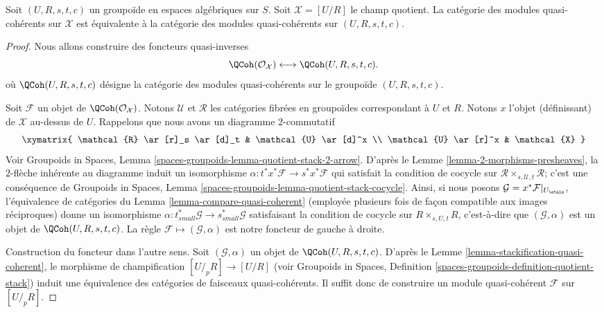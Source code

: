 \begin{proposition}
\label{proposition-quasi-coherent}
Soit $(U, R, s, t, c)$ un groupoïde en espaces algébriques sur $S$.
Soit $\mathcal{X} = [U/R]$ le champ quotient.
La catégorie des modules quasi-cohérents sur $\mathcal{X}$
est équivalente à la catégorie des modules quasi-cohérents
sur $(U, R, s, t, c)$.
\end{proposition}

\begin{proof}
Nous allons construire des foncteurs quasi-inverses
$$
\QCoh(\mathcal{O}_\mathcal{X})
\longleftrightarrow
\QCoh(U, R, s, t, c).
$$
où $\QCoh(U, R, s, t, c)$ désigne la catégorie des modules quasi-cohérents
sur le groupoïde $(U, R, s, t, c)$.

\medskip\noindent
Soit $\mathcal{F}$ un objet de $\QCoh(\mathcal{O}_\mathcal{X})$.
Notons $\mathcal{U}$ et $\mathcal{R}$ les catégories fibrées en groupoïdes
correspondant à $U$ et $R$. Notons $x$ l'objet (définissant) de $\mathcal{X}$
au-dessus de $U$. Rappelons que nous avons un diagramme $2$-commutatif
$$
\xymatrix{
\mathcal{R} \ar[r]_s \ar[d]_t & \mathcal{U} \ar[d]^x \\
\mathcal{U} \ar[r]^x & \mathcal{X}
}
$$
Voir Groupoids in Spaces, Lemma
\ref{spaces-groupoids-lemma-quotient-stack-2-arrow}.
D'après le Lemme \ref{lemma-2-morphisms-presheaves},
la $2$-flèche inhérente au diagramme induit un isomorphisme
$\alpha : t^*x^*\mathcal{F} \to s^*x^*\mathcal{F}$
qui satisfait la condition de cocycle sur
$\mathcal{R} \times_{s, \mathcal{U}, t} \mathcal{R}$;
c'est une conséquence de Groupoids in Spaces, Lemma
\ref{spaces-groupoids-lemma-quotient-stack-cocycle}.
Ainsi, si nous posons $\mathcal{G} = x^*\mathcal{F}|_{U_\etale}$,
l'équivalence de catégories du
Lemma \ref{lemma-compare-quasi-coherent}
(employée plusieurs fois de façon compatible aux images réciproques)
donne un isomorphisme
$\alpha : t_{small}^*\mathcal{G} \to s_{small}^*\mathcal{G}$
satisfaisant la condition de cocycle sur $R \times_{s, U, t} R$, c'est-à-dire que
$(\mathcal{G}, \alpha)$ est un objet de $\QCoh(U, R, s, t, c)$.
La règle $\mathcal{F} \mapsto (\mathcal{G}, \alpha)$ est notre
foncteur de gauche à droite.

\medskip\noindent
Construction du foncteur dans l'autre sens.
Soit $(\mathcal{G}, \alpha)$ un objet de $\QCoh(U, R, s, t, c)$.
D'après le Lemme \ref{lemma-stackification-quasi-coherent},
le morphisme de champification $[U/_{\!p}R] \to [U/R]$ (voir
Groupoids in Spaces, Definition
\ref{spaces-groupoids-definition-quotient-stack})
induit une équivalence des catégories de faisceaux quasi-cohérents.
Il suffit donc de construire un module quasi-cohérent $\mathcal{F}$
sur $[U/_{\!p}R]$.


\end{proof}
